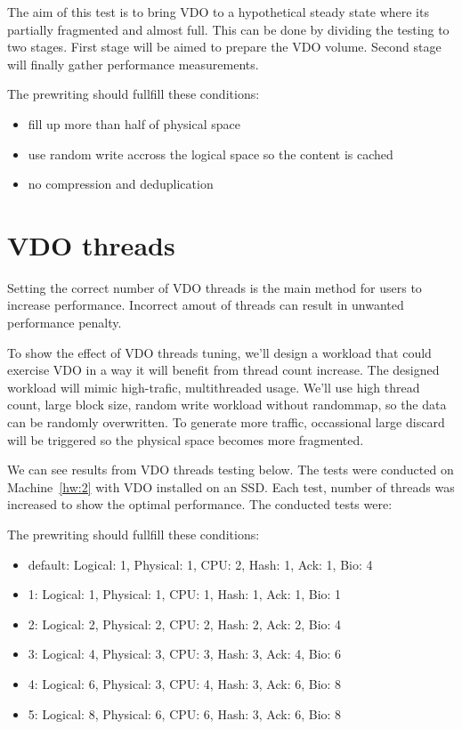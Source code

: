 \documentclass[
  color, %
  table, %
  lof,   %
  lot,   %
]{fithesis3}
\begin{document}
The aim of this test is to bring VDO to a hypothetical steady state where its partially fragmented and almost full. This can be done by dividing the testing to two stages. First stage will be aimed to prepare the VDO volume. Second stage will finally gather performance measurements.

The prewriting should fullfill these conditions:
\begin{itemize}
    \item fill up more than half of physical space
    \item use random write accross the logical space so the content is cached
    \item no compression and deduplication
\end{itemize}

\clearpage
\section{VDO threads}
Setting the correct number of VDO threads is the main method for users to increase performance. Incorrect amout of threads can result in unwanted performance penalty.

To show the effect of VDO threads tuning, we'll design a workload that could exercise VDO in a way it will benefit from thread count increase. The designed workload will mimic high-trafic, multithreaded usage. We'll use high thread count, large block size, random write workload without randommap, so the data can be randomly overwritten. To generate more traffic, occassional large discard will be triggered so the physical space becomes more fragmented.

We can see results from VDO threads testing below. The tests were conducted on Machine~\ref{hw:2} with VDO installed on an SSD. Each test, number of threads was increased to show the optimal performance. The conducted tests were:

The prewriting should fullfill these conditions:
\begin{itemize}
    \item default: Logical: 1, Physical: 1, CPU: 2, Hash: 1, Ack: 1, Bio: 4
    \item 1: Logical: 1, Physical: 1, CPU: 1, Hash: 1, Ack: 1, Bio: 1
    \item 2: Logical: 2, Physical: 2, CPU: 2, Hash: 2, Ack: 2, Bio: 4
    \item 3: Logical: 4, Physical: 3, CPU: 3, Hash: 3, Ack: 4, Bio: 6
    \item 4: Logical: 6, Physical: 3, CPU: 4, Hash: 3, Ack: 6, Bio: 8
    \item 5: Logical: 8, Physical: 6, CPU: 6, Hash: 3, Ack: 6, Bio: 8
\end{itemize}
\end{document}
